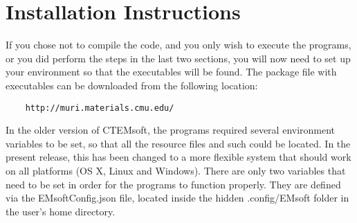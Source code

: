 \documentclass[DIV=calc, paper=letter, fontsize=11pt]{scrartcl}	 %
\begin{document}
\section{Installation Instructions\label{sec:todo}}
If you chose not to compile the code, and you only wish to execute the programs, or you did perform the steps in the last two sections, you will
now need to set up your environment so that the executables will be found.  The package file with executables can be downloaded from the following
location:
\begin{verbatim}
	http://muri.materials.cmu.edu/
\end{verbatim}
In the older version of CTEMsoft, the programs required several environment variables to be set, so
that all the resource files and such could be located. In the present release, this has been changed
to a more flexible system that should work on all platforms (OS X, Linux and Windows).  There are 
only two variables that need to be set in order for the programs to function properly.  They are defined 
via the \textsf{EMsoftConfig.json} file, located inside the hidden \textsf{.config/EMsoft} folder in the user's 
home directory.
\end{document}
